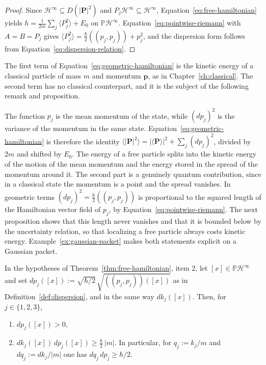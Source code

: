 \begin{proof}
	Since $\mathcal{H}^\infty\subseteq D(|\mathbf{P}|^2)$ and $P_j\mathcal{H}^\infty\subseteq\mathcal{H}^\infty$, Equation~\eqref{eq:free-hamiltonian} yields $h=\tfrac{1}{2m}\sum_j\langle P_j^2\rangle+E_0$ on $\mathbb{P}\mathcal{H}^\infty$. Equation~\eqref{eq:pointwise-riemann} with $A=B=P_j$ gives $\langle P_j^2\rangle=\tfrac{\hbar}{2}((p_j,p_j))+p_j^2$, and the dispersion form follows from Equation~\eqref{eq:dispersion-relation}.
\end{proof}

\noindent The first term of Equation~\eqref{eq:geometric-hamiltonian} is the kinetic energy of a classical particle of mass $m$ and momentum $\mathbf{p}$, as in Chapter~\ref{ch:classical}. The second term has no classical counterpart, and it is the subject of the following remark and proposition.

\begin{remark}\label{rem:dispersion-term}
	The function $p_j$ is the mean momentum of the state, while $(d p_j)^2$ is the variance of the momentum in the same state. Equation~\eqref{eq:geometric-hamiltonian} is therefore the identity $\langle|\mathbf{P}|^2\rangle=|\langle\mathbf{P}\rangle|^2+\sum_j(d p_j)^2$, divided by $2m$ and shifted by $E_0$. The energy of a free particle splits into the kinetic energy of the motion of the mean momentum and the energy stored in the spread of the momentum around it. The second part is a genuinely quantum contribution, since in a classical state the momentum is a point and the spread vanishes. In geometric terms $(d p_j)^2=\tfrac{\hbar}{2}((p_j,p_j))$ is proportional to the squared length of the Hamiltonian vector field of $p_j$, by Equation~\eqref{eq:pointwise-riemann}. The next proposition shows that this length never vanishes and that it is bounded below by the uncertainty relation, so that localizing a free particle always costs kinetic energy. Example~\ref{ex:gaussian-packet} makes both statements explicit on a Gaussian packet.
\end{remark}

\begin{proposition}\label{prop:dispersion-positive}
	In the hypotheses of Theorem~\ref{thm:free-hamiltonian}, item 2, let $[x]\in\mathbb{P}\mathcal{H}^\infty$ and set $d p_j([x]):=\sqrt{\hbar/2}\,\sqrt{((p_j,p_j))([x])}$ as in Definition~\ref{def:dispersion}, and in the same way $d k_j([x])$. Then, for $j\in\{1,2,3\}$,
	\begin{enumerate}
		\item $d p_j([x])>0$,
		\item $d k_j([x])\,d p_j([x])\ge\frac{\hbar}{2}\,|m|$. In particular, for $q_j:=k_j/m$ and $d q_j:=d k_j/|m|$ one has $d q_j\,d p_j\ge\hbar/2$.
	\end{enumerate}
\end{proposition}


